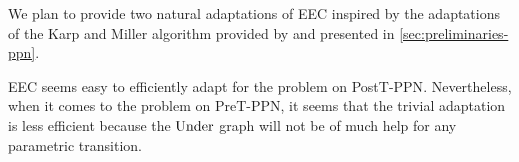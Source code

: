 %

We plan to provide two natural adaptations of \ac{EEC} inspired by the adaptations of the Karp and Miller algorithm provided by \cite{David17} and presented in \autoref{sec:preliminaries-ppn}.

\ac{EEC} seems easy to efficiently adapt for the \Ecov problem on PostT-\ac{PPN}.
Nevertheless, when it comes to the \Ucov problem on PreT-\ac{PPN}, it seems that the trivial adaptation is less efficient because the $\operatorname{Under}$ graph will not be of much help for any parametric transition.

